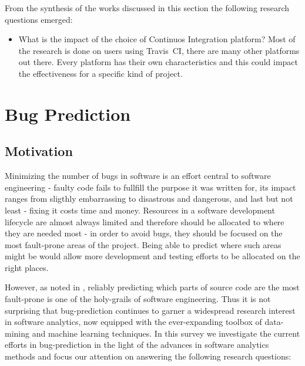 \documentclass[]{book}
\providecommand{\tightlist}{%
  \setlength{\itemsep}{0pt}\setlength{\parskip}{0pt}}
\begin{document}
From the synthesis of the works discussed in this section the following
research questions emerged:

\begin{itemize}
\tightlist
\item
  What is the impact of the choice of Continuos Integration platform?
  Most of the research is done on users using Travis~CI, there are many
  other platforms out there. Every platform has their own
  characteristics and this could impact the effectiveness for a specific
  kind of project.
\end{itemize}

\chapter{Bug Prediction}\label{bug-prediction}

\section{Motivation}\label{motivation-2}

Minimizing the number of bugs in software is an effort central to
software engineering - faulty code fails to fullfill the purpose it was
written for, its impact ranges from sligthly embarrassing to disastrous
and dangerous, and last but not least - fixing it costs time and money.
Resources in a software development lifecycle are almost always limited
and therefore should be allocated to where they are needed most - in
order to avoid bugs, they should be focused on the most fault-prone
areas of the project. Being able to predict where such areas might be
would allow more development and testing efforts to be allocated on the
right places.

However, as noted in \citet{DAmbros2012}, reliably predicting which
parts of source code are the most fault-prone is one of the holy-grails
of software engineering. Thus it is not surprising that bug-prediction
continues to garner a widespread research interest in software
analytics, now equipped with the ever-expanding toolbox of data-mining
and machine learning techniques. In this survey we investigate the
current efforts in bug-prediction in the light of the advances in
software analytics methods and focus our attention on answering the
following research questions:
\end{document}

